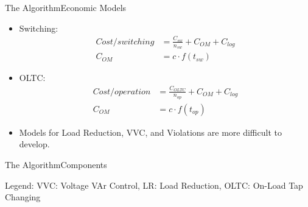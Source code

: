 \documentclass[xcolor=svgnames,aspectratio=32,8pt]{beamer}
\begin{document}
\begin{frame}
  {The Algorithm}{Economic Models}
\begin{changemargin}{-0.8cm}{-0.8cm}
  \vspace{0.3cm}
  \begin{itemize}
  \item Switching:
  \begin{align*} 
    Cost/switching&=\frac{C_{sw}}{n_{sw}}+ C_{OM}+C_{log}\\
    C_{OM}&=c \cdot f(t_{sw})
  \end{align*}
  \item OLTC:
  \begin{align*} 
    Cost/operation&=\frac{C_{OLTC}}{n_{op}}+ C_{OM}+C_{log}\\
    C_{OM}&=c \cdot f(t_{op})
  \end{align*}
  \vspace{0.2cm}
  \item Models for Load Reduction, VVC, and Violations are more difficult to develop.
  \end{itemize}

  \vspace{0.3cm}
  \centering

\end{changemargin}
\end{frame}


\begin{frame}
  {The Algorithm}{Components}
    \vspace{0.3cm}
    \begin{figure}[!h]
    \centering
    \resizebox{!}{0.45\paperwidth}{%
    
    }
    \end{figure}
    \vspace{-0.3cm}
    {\footnotesize Legend: VVC: Voltage VAr Control, LR: Load Reduction, OLTC: On-Load Tap Changing}
\end{frame}
\end{document}
